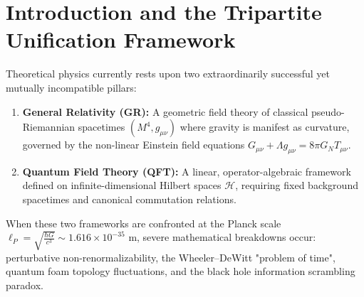 \documentclass[11pt,a4paper,reqno]{amsart}
\theoremstyle{definition}
\numberwithin{equation}{section}
\begin{document}
\maketitle

\tableofcontents

\section{Introduction and the Tripartite Unification Framework}
\label{sec:intro}

Theoretical physics currently rests upon two extraordinarily successful yet mutually incompatible pillars:
\begin{enumerate}[label=(\alph*)]
    \item \textbf{General Relativity (GR):} A geometric field theory of classical pseudo-Riemannian spacetimes $(M^4, g_{\mu\nu})$ where gravity is manifest as curvature, governed by the non-linear Einstein field equations $G_{\mu\nu} + \Lambda g_{\mu\nu} = 8\pi G_N T_{\mu\nu}$.
    \item \textbf{Quantum Field Theory (QFT):} A linear, operator-algebraic framework defined on infinite-dimensional Hilbert spaces $\mathscr{H}$, requiring fixed background spacetimes and canonical commutation relations.
\end{enumerate}

When these two frameworks are confronted at the Planck scale $\ell_P = \sqrt{\frac{\hbar G}{c^3}} \sim 1.616 \times 10^{-35}\text{ m}$, severe mathematical breakdowns occur: perturbative non-renormalizability, the Wheeler--DeWitt "problem of time", quantum foam topology fluctuations, and the black hole information scrambling paradox.
\end{document}
